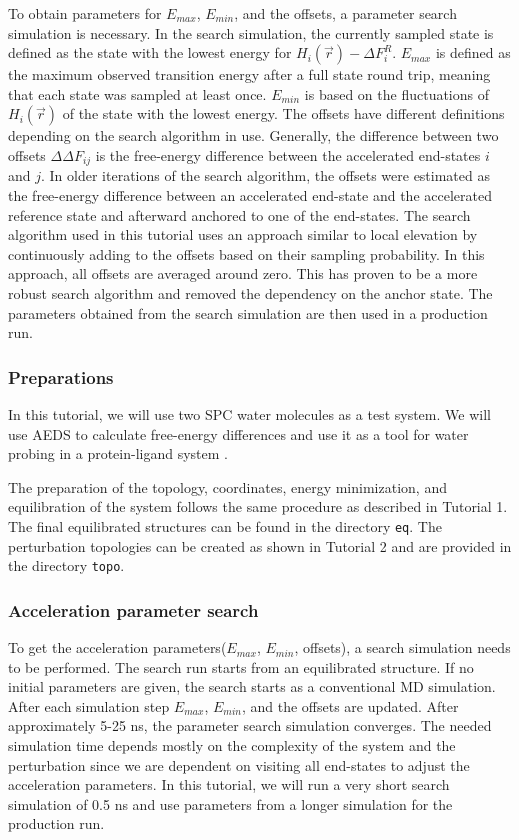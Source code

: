 To obtain parameters for $E_{max}$, $E_{min}$, and the offsets, a parameter search simulation is necessary. In the search simulation, the currently sampled state is defined as the state with the lowest energy for $H_i(\vec{r}) - \Delta F_{i}^R$. $E_{max}$ is defined as the maximum observed transition energy after a full state round trip, meaning that each state was sampled at least once. $E_{min}$ is based on the fluctuations of $H_i(\vec{r})$ of the state with the lowest energy. The offsets have different definitions depending on the search algorithm in use. Generally, the difference between two offsets $\Delta\Delta F_{ij}$ is the free-energy difference between the accelerated end-states $i$ and $j$. In older iterations of the search algorithm, the offsets were estimated as the free-energy difference between an accelerated end-state and the accelerated reference state and afterward anchored to one of the end-states. The search algorithm used in this tutorial uses an approach similar to local elevation by continuously adding to the offsets based on their sampling probability. In this approach, all offsets are averaged around zero. This has proven to be a more robust search algorithm and removed the dependency on the anchor state. The parameters obtained from the search simulation are then used in a production run.

\subsubsection{Preparations}
In this tutorial, we will use two SPC water molecules as a test system. We will use AEDS to calculate free-energy differences and use it as a tool for water probing in a protein-ligand system \cite{gracia1}.   
 
The preparation of the topology, coordinates, energy minimization, and equilibration of the system follows the same procedure as described in Tutorial 1.
The final equilibrated structures can be found in the directory \texttt{eq}. The perturbation topologies can be created as shown in Tutorial 2 and are provided in the directory \texttt{topo}.

\subsubsection{Acceleration parameter search}
To get the acceleration parameters($E_{max}$, $E_{min}$, offsets), a search simulation needs to be performed. The search run starts from an equilibrated structure. If no initial parameters are given, the search starts as a conventional MD simulation. After each simulation step $E_{max}$, $E_{min}$, and the offsets are updated. After approximately 5-25 ns, the parameter search simulation converges. The needed simulation time depends mostly on the complexity of the system and the perturbation since we are dependent on visiting all end-states to adjust the acceleration parameters. In this tutorial, we will run a very short search simulation of 0.5 ns and use parameters from a longer simulation for the production run.  

